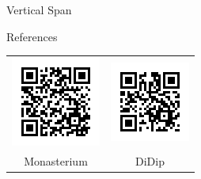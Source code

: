 \documentclass{beamer}
\newlength{\sepwidth}
\newcommand{\separatorcolumn}{\begin{column}{\sepwidth}\end{column}}
\begin{document}
\begin{frame}{}
\begin{columns}[t]
\begin{column}{.33\linewidth}
\begin{block}{Vertical Span}
				\lipsum*[1][9-11]
			\end{block}
			\begin{block}{References}
			\nocite{*}
			
			
				\vspace{.1em}
				\centering
				\begin{tabular}{cc}
				\includegraphics[width=.3\linewidth]{pics/qr_monasterium.png} &
        				\includegraphics[width=.3\linewidth]{pics/qr_didip.png} \\
				Monasterium &
       	 				DiDip
				\end{tabular}
			\end{block}
      		\end{column}
		\separatorcolumn
   	\end{columns}
  \end{frame}
\end{document}
